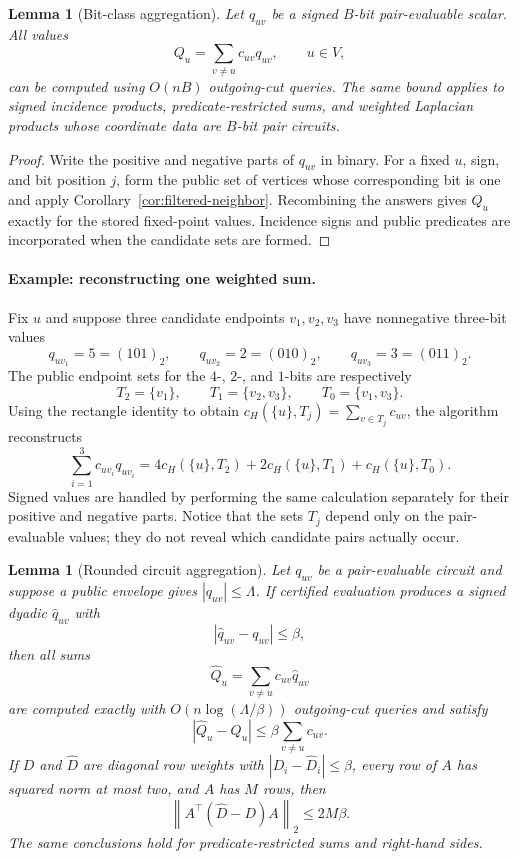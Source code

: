 \documentclass[11pt]{article}
\newtheorem{lemma}[theorem]{Lemma}
\theoremstyle{definition}
\newcommand{\cH}{c_H}
\newcommand{\norm}[1]{\left\lVert #1\right\rVert}
\begin{document}
\begin{lemma}[Bit-class aggregation]\label{lem:aggregate}
Let $q_{uv}$ be a signed $B$-bit pair-evaluable scalar.  All values
\[
        Q_u=\sum_{v\ne u}c_{uv}q_{uv},\qquad u\in V,
\]
can be computed using $O(nB)$ outgoing-cut queries.  The same bound applies
to signed incidence products, predicate-restricted sums, and weighted
Laplacian products whose coordinate data are $B$-bit pair circuits.
\end{lemma}

\begin{proof}
Write the positive and negative parts of $q_{uv}$ in binary.  For a fixed
$u$, sign, and bit position $j$, form the public set of vertices whose
corresponding bit is one and apply Corollary~\ref{cor:filtered-neighbor}.
Recombining the answers gives $Q_u$ exactly for the stored fixed-point
values.  Incidence signs and public predicates are incorporated when the
candidate sets are formed.
\end{proof}

\paragraph{Example: reconstructing one weighted sum.}
Fix $u$ and suppose three candidate endpoints $v_1,v_2,v_3$ have nonnegative
three-bit values
\[
 q_{uv_1}=5=(101)_2,\qquad
 q_{uv_2}=2=(010)_2,\qquad
 q_{uv_3}=3=(011)_2.
\]
The public endpoint sets for the $4$-, $2$-, and $1$-bits are respectively
\[
 T_2=\{v_1\},\qquad T_1=\{v_2,v_3\},\qquad
 T_0=\{v_1,v_3\}.
\]
Using the rectangle identity to obtain
$\cH(\{u\},T_j)=\sum_{v\in T_j}c_{uv}$, the algorithm reconstructs
\[
 \sum_{i=1}^3 c_{uv_i}q_{uv_i}
 =4\cH(\{u\},T_2)+2\cH(\{u\},T_1)+\cH(\{u\},T_0).
\]
Signed values are handled by performing the same calculation separately for
their positive and negative parts.  Notice that the sets $T_j$ depend only
on the pair-evaluable values; they do not reveal which candidate pairs
actually occur.

\begin{lemma}[Rounded circuit aggregation]\label{lem:rounded-aggregate}
Let $q_{uv}$ be a pair-evaluable circuit and suppose a public envelope gives
$|q_{uv}|\le\Lambda$.  If certified evaluation produces a signed dyadic
$\widehat q_{uv}$ with
\[
        |\widehat q_{uv}-q_{uv}|\le\beta ,
\]
then all sums
\[
 \widehat Q_u=\sum_{v\ne u}c_{uv}\widehat q_{uv}
\]
are computed exactly with
$O(n\log(\Lambda/\beta))$ outgoing-cut queries and satisfy
\[
 |\widehat Q_u-Q_u|
 \le \beta\sum_{v\ne u}c_{uv}.
\]
If $D$ and $\widehat D$ are diagonal row weights with
$|D_i-\widehat D_i|\le\beta$, every row of $A$ has squared norm at most two,
and $A$ has $M$ rows, then
\begin{equation}\label{eq:rounded-normal-error}
 \norm{A^\top(\widehat D-D)A}_2\le2M\beta .
\end{equation}
The same conclusions hold for predicate-restricted sums and right-hand sides.
\end{lemma}
\end{document}
